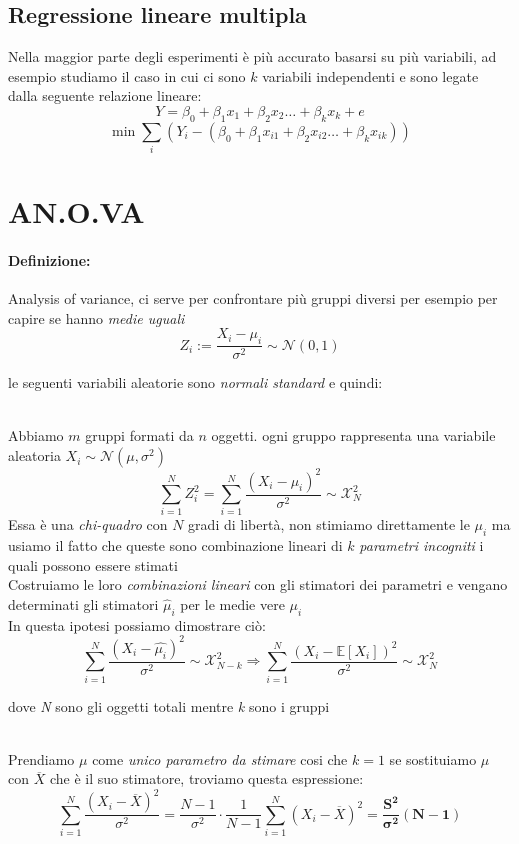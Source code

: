 \documentclass[]{article}
\newcommand{\ev}{\mathbb{E}[X]}
\renewcommand{\ev}[1]{\mathbb{E}\left[#1\right]}
\newcommand{\definizione}{\paragraph{Definizione:}}
\begin{document}
    \subsection{Regressione lineare multipla}
    Nella maggior parte degli esperimenti è più accurato basarsi su più variabili, ad esempio studiamo il caso in cui ci sono $k$ variabili independenti e sono legate dalla seguente relazione lineare:
    \[ Y = \beta_0 + \beta_1 x_1 + \beta_2 x_2 \ldots + \beta_k x_k +e \]
    \[ \min\sum_i(Y_i -(\beta_0+\beta_1x_{i1} + \beta_2x_{i2} \ldots + \beta_kx_{ik})) \]
    \section{AN.O.VA} 
    \definizione Analysis of variance, ci serve per confrontare più gruppi diversi per esempio per capire se hanno \textit{medie uguali}
    \[ Z_i := \frac{X_i - \mu_i}{\sigma^2} \sim \mathcal{N}(0,1) \]
    \centerline{le seguenti variabili aleatorie sono \textit{normali standard} e quindi:} \\[2ex]
    Abbiamo $m$ gruppi formati da $n$ oggetti. ogni gruppo rappresenta una variabile aleatoria $X_i \sim \mathcal{N}(\mu, \sigma^2)$
    \[ \sum_{i=1}^{N} Z^2_i = \sum_{i=1}^{N} \frac{(X_i - \mu_i)^2}{\sigma^2} \sim \mathcal{X}^2_N \]
    Essa è una \textit{chi-quadro} con $N$ gradi di libertà, non stimiamo direttamente le $\mu_i$ ma usiamo il fatto che queste sono combinazione lineari di $k$ \textit{parametri incogniti} i quali possono essere stimati \\
    Costruiamo le loro \textit{combinazioni lineari} con gli stimatori dei parametri e vengano determinati gli stimatori $\hat{\mu}_i$ per le medie vere $\mu_i$ \\
    In questa ipotesi possiamo dimostrare ciò:
    \[ \sum_{i=1}^{N} \frac{(X_i - \hat{\mu_i})^2}{\sigma^2} \sim \mathcal{X}^2_{N-k} \Longrightarrow \sum_{i=1}^{N} \frac{(X_i - \ev{X_i})^2}{\sigma^2} \sim \mathcal{X}^2_N \]
    \centerline{dove \textit{N} sono gli oggetti totali mentre \textit{k} sono i gruppi} \\[2ex]

    Prendiamo $\mu$ come \textit{unico parametro da stimare} cosi che $k=1$ se sostituiamo $\mu$ con $\overline{X}$ che è il suo stimatore, troviamo questa espressione:
    \[ \sum_{i=1}^{N} \frac{(X_i - \overline{X})^2}{\sigma^2} = \frac{N-1}{\sigma^2} \cdot \frac{1}{N-1} \sum_{i=1}^{N}(X_i - \overline{X})^2 = \boldsymbol{\frac{S^2}{\sigma^2}(N-1)} \]
\end{document}
